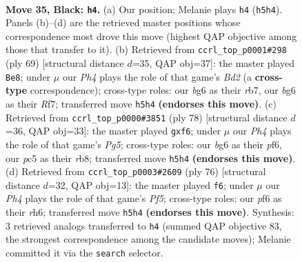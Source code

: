 \documentclass[11pt]{article}
\begin{document}
\clearpage

\begin{figure}[p]\centering
\begin{subfigure}{0.46\textwidth}\centering
\resizebox{\linewidth}{!}{%
\newchessgame
\chessboard[
  setfen={1k5r/r7/p4PBb/2P2R1p/1P6/8/8/R3K3 b Q - 4 35},
  showmover=false,
  pgfstyle=straightmove, color=movearrow, markmove={h5-h4}
]}
\caption{}
\end{subfigure}\hfill
\begin{subfigure}{0.46\textwidth}\centering
\resizebox{\linewidth}{!}{%
\newchessgame
\chessboard[
  setfen={5k2/pR1b1r2/3p1P1r/3P4/4B3/8/P7/K4R2 b - - 0 35},
  showmover=false,
  pgfstyle=straightmove, color=movearrow, markmove={d7-e8}
]}
\caption{}
\end{subfigure}
\\[4pt]
\begin{subfigure}{0.46\textwidth}\centering
\resizebox{\linewidth}{!}{%
\newchessgame
\chessboard[
  setfen={1r4k1/5p2/p4p2/1r4P1/8/8/1P2R3/1K5R w - - 0 40},
  showmover=false,
  pgfstyle=straightmove, color=movearrow, markmove={g5-f6}
]}
\caption{}
\end{subfigure}\hfill
\begin{subfigure}{0.46\textwidth}\centering
\resizebox{\linewidth}{!}{%
\newchessgame
\chessboard[
  setfen={1r6/8/3p3r/1P1B1Pk1/3p4/7b/5R2/4R1K1 w - - 1 39},
  showmover=false,
  pgfstyle=straightmove, color=movearrow, markmove={f5-f6}
]}
\caption{}
\end{subfigure}
\caption{\textbf{Move 35, Black: \texttt{h4}.} (a) Our position; Melanie plays \texttt{h4} (\texttt{h5h4}). Panels (b)--(d) are the retrieved master positions whose correspondence most drove this move (highest QAP objective among those that transfer to it). (b) Retrieved from \texttt{ccrl\_top\_p0001\#298} (ply 69) [structural distance $d$=35, QAP obj=37]: the master played \texttt{Be8}; under $\mu$ our \emph{Ph4} plays the role of that game's \emph{Bd2} (a \textbf{cross-type} correspondence); cross-type roles: our \emph{b}g6 as their \emph{r}b7, our \emph{b}g6 as their \emph{R}f7; transferred move \texttt{h5h4} \textbf{(endorses this move)}. (c) Retrieved from \texttt{ccrl\_top\_p0000\#3851} (ply 78) [structural distance $d$=36, QAP obj=33]: the master played \texttt{gxf6}; under $\mu$ our \emph{Ph4} plays the role of that game's \emph{Pg5}; cross-type roles: our \emph{b}g6 as their \emph{p}f6, our \emph{p}c5 as their \emph{r}b8; transferred move \texttt{h5h4} \textbf{(endorses this move)}. (d) Retrieved from \texttt{ccrl\_top\_p0003\#2609} (ply 76) [structural distance $d$=32, QAP obj=13]: the master played \texttt{f6}; under $\mu$ our \emph{Ph4} plays the role of that game's \emph{Pf5}; cross-type roles: our \emph{p}f6 as their \emph{r}h6; transferred move \texttt{h5h4} \textbf{(endorses this move)}. Synthesis: 3 retrieved analogs transferred to \texttt{h4} (summed QAP objective 83, the strongest correspondence among the candidate moves); Melanie committed it via the \texttt{search} selector.}
\label{fig:thought-m69}
\end{figure}
\end{document}
